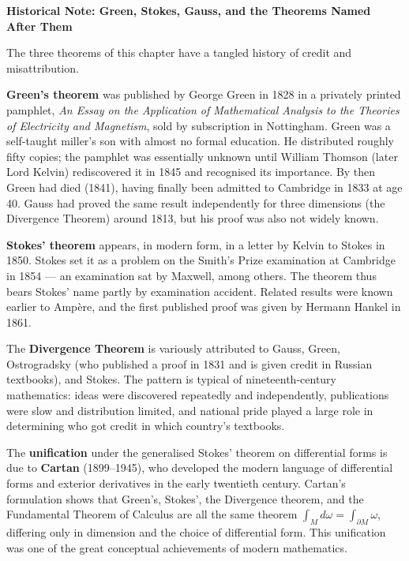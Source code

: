 \documentclass[12pt, openany]{book}
\theoremstyle{plain}
\theoremstyle{definition}
\theoremstyle{remark}
\begin{document}
\begin{remarkbox}
\textbf{Historical Note: Green, Stokes, Gauss, and the Theorems Named After Them}

The three theorems of this chapter have a tangled history of credit and misattribution.

\textbf{Green's theorem} was published by George Green in 1828 in a privately printed pamphlet, \emph{An Essay on the Application of Mathematical Analysis to the Theories of Electricity and Magnetism}, sold by subscription in Nottingham. Green was a self-taught miller's son with almost no formal education. He distributed roughly fifty copies; the pamphlet was essentially unknown until William Thomson (later Lord Kelvin) rediscovered it in 1845 and recognised its importance. By then Green had died (1841), having finally been admitted to Cambridge in 1833 at age 40. Gauss had proved the same result independently for three dimensions (the Divergence Theorem) around 1813, but his proof was also not widely known.

\textbf{Stokes' theorem} appears, in modern form, in a letter by Kelvin to Stokes in 1850. Stokes set it as a problem on the Smith's Prize examination at Cambridge in 1854 --- an examination sat by Maxwell, among others. The theorem thus bears Stokes' name partly by examination accident. Related results were known earlier to Ampère, and the first published proof was given by Hermann Hankel in 1861.

The \textbf{Divergence Theorem} is variously attributed to Gauss, Green, Ostrogradsky (who published a proof in 1831 and is given credit in Russian textbooks), and Stokes. The pattern is typical of nineteenth-century mathematics: ideas were discovered repeatedly and independently, publications were slow and distribution limited, and national pride played a large role in determining who got credit in which country's textbooks.

The \textbf{unification} under the generalised Stokes' theorem on differential forms is due to \textbf{Cartan} (1899--1945), who developed the modern language of differential forms and exterior derivatives in the early twentieth century. Cartan's formulation shows that Green's, Stokes', the Divergence theorem, and the Fundamental Theorem of Calculus are all the same theorem $\int_M d\omega = \int_{\partial M} \omega$, differing only in dimension and the choice of differential form. This unification was one of the great conceptual achievements of modern mathematics.
\end{remarkbox}
\color{black}
\end{document}
